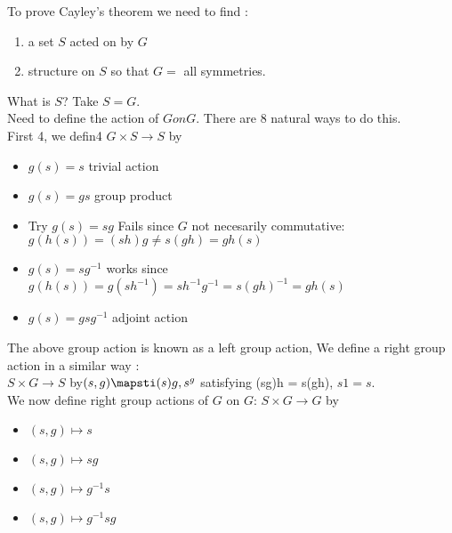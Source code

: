 \noindent 
To prove Cayley's theorem we need to find : 
\begin{enumerate}
    \item a set $S$ acted on by $G$
    \item structure on $S$ so that $G=$ all symmetries.
\end{enumerate}

\noindent
What is $S$? \quad Take $S = G$. \\

\noindent
Need to define the action of $G on G$. There are 8 natural ways to do this. \\
First 4, we defin4 $G \times S \to S$ by 
\begin{itemize}
    \item $g(s)=s$ \quad trivial action 
    \item $g(s) = gs$ \quad group product 
    \item Try $g(s)=sg$ \quad Fails since $G$ not necesarily commutative: $g(h(s)) = (sh)g \neq s(gh) = gh(s)$
    \item $g(s) = sg^{-1}$ \quad works since $g(h(s)) = g(sh^{-1}) = sh^{-1}g^{-1} = s(gh)^{-1} = gh(s)$
    \item $g(s) = gsg^{-1}$ \quad adjoint action 
\end{itemize}

\noindent 
The above group action is known as a left group action, We define a right group action in a similar way : \\
$S \times G \to S$ by$(s,g) \mapsti (s)g, s^g$ satisfying (sg)h = s(gh), $s1 = s$. \\

\noindent
We now define right group actions of $G$ on $G$: $S \times G \to G$ by 
\begin{itemize}
    \item $(s,g) \mapsto s$
    \item $(s,g) \mapsto sg$
    \item $(s,g) \mapsto g^{-1}s$
    \item $(s,g) \mapsto g^{-1}sg$
\end{itemize}